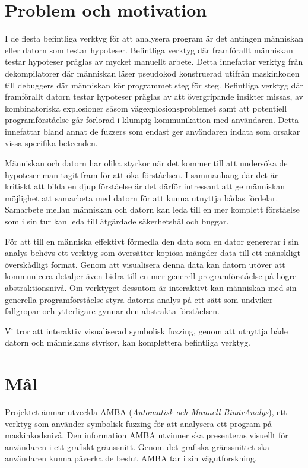 \section{Problem och motivation}

I de flesta befintliga verktyg för att analysera program är det antingen
människan eller datorn som testar hypoteser. Befintliga verktyg där
framförallt människan testar hypoteser präglas av mycket manuellt arbete. Detta
innefattar verktyg från dekompilatorer där människan läser pseudokod konstruerad
utifrån maskinkoden till debuggers där människan kör programmet steg för steg.
Befintliga verktyg där framförallt datorn testar hypoteser präglas av att
övergripande insikter missas, av kombinatoriska explosioner såsom
vägexplosionsproblemet samt att potentiell programförståelse går förlorad i
klumpig kommunikation med användaren. Detta innefattar bland annat de fuzzers
som endast ger användaren indata som orsakar vissa specifika beteenden.

Människan och datorn har olika styrkor när det kommer till att undersöka de
hypoteser man tagit fram för att öka förståelsen. I sammanhang där det är
kritiskt att bilda en djup förståelse är det därför intressant att ge människan
möjlighet att samarbeta med datorn för att kunna utnyttja bådas fördelar.
Samarbete mellan människan och datorn kan leda till en mer komplett förståelse
som i sin tur kan leda till åtgärdade säkerhetshål och buggar.

För att till en människa effektivt förmedla den data som en dator genererar i
sin analys behövs ett verktyg som översätter kopiösa mängder data till ett
mänskligt överskådligt format. Genom att visualisera denna data kan datorn
utöver att kommunicera detaljer även bidra till en mer generell
programförståelse på högre abstraktionsnivå. Om verktyget dessutom är
interaktivt kan människan med sin generella programförståelse styra datorns
analys på ett sätt som undviker fallgropar och ytterligare gynnar den abstrakta
förståelsen.

Vi tror att interaktiv visualiserad symbolisk fuzzing, genom att utnyttja både
datorn och människans styrkor, kan komplettera befintliga verktyg.

\section{Mål}\label{sec:mal}

Projektet ämnar utveckla AMBA (\emph{Automatisk och Manuell BinärAnalys}), ett
verktyg som använder symbolisk fuzzing för att analysera ett program på
maskinkodsnivå. Den information AMBA utvinner ska presenteras visuellt för
användaren i ett grafiskt gränssnitt. Genom det grafiska gränssnittet ska
användaren kunna påverka de beslut AMBA tar i sin vägutforskning.

